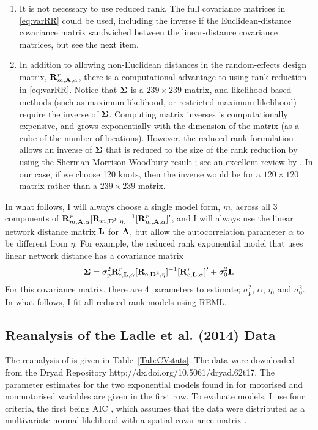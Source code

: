 \documentclass[11pt, titlepage]{article}\usepackage[]{graphicx}\usepackage[]{color}
\begin{document}
\begin{spacing}{1.9}
\begin{flushleft}
\begin{enumerate}
		\item It is not necessary to use reduced rank.  The full covariance matrices in \ref{eq:varRR} could be used, including the inverse if the Euclidean-distance covariance matrix sandwiched between the linear-distance covariance matrices, but see the next item.
		\item In addition to allowing non-Euclidean distances in the random-effects design matrix, $\mathbf{R}^r_{m,\mathbf{A},\alpha}$, there is a computational advantage to using rank reduction in \ref{eq:varRR}.  Notice that $\mbox{\boldmath $\Sigma$}$ is a $239 \times 239$ matrix, and likelihood based methods (such as maximum likelihood, or restricted maximum likelihood) require the inverse of $\mbox{\boldmath $\Sigma$}$.  Computing matrix inverses is computationally expensive, and grows exponentially with the dimension of the matrix (as a cube of the number of locations).  However, the reduced rank formulation allows an inverse of $\mbox{\boldmath $\Sigma$}$ that is reduced to the size of the rank reduction by using the Sherman-Morrison-Woodbury result \citep{Sher:Morr:adju:1949,Wood:inve:1950}; see an excellent review by \citet{Hend:Sear:on:1981}. In our case, if we choose 120 knots, then the inverse would be for a $120 \times 120$ matrix rather than a $239 \times 239$ matrix.
		
\end{enumerate}

In what follows, I will always choose a single model form, $m$, across all 3 components of $\mathbf{R}^r_{m,\mathbf{A},\alpha}[\mathbf{R}_{m,\mathbf{D}^k,\eta}]^{-1}[\mathbf{R}^r_{m,\mathbf{A},\alpha}]^{\prime}$, and I will always use the linear network distance matrix $\mathbf{L}$ for $\mathbf{A}$, but allow the autocorrelation parameter $\alpha$ to be different from $\eta$.  For example, the reduced rank exponential model that uses linear network distance has a covariance matrix
\begin{equation} \label{eq:RRmodCov}
				\mbox{\boldmath $\Sigma$} = \sigma^2_\textrm{p}\mathbf{R}^r_{\textrm{e},\mathbf{L},\alpha}[\mathbf{R}_{\textrm{e},\mathbf{D}^k,\eta}]^{-1}[\mathbf{R}^r_{\textrm{e},\mathbf{L},\alpha}]^{\prime} + \sigma^2_0\mathbf{I}.
\end{equation}
For this covariance matrix, there are 4 parameters to estimate; $\sigma^2_\textrm{p}$, $\alpha$, $\eta$, and $\sigma^2_0$.  In what follows, I fit all reduced rank models using REML.

\subsection*{Reanalysis of the Ladle et al. (2014) Data}

The reanalysis of \citet{Ladl:Avga:Whea:Boyc:pred:2016} is given in Table~\ref{Tab:CVstats}. The data were downloaded from the Dryad Repository http://dx.doi.org/10.5061/dryad.62t17.  The parameter estimates for the two exponential models found in \citet{Ladl:Avga:Whea:Boyc:pred:2016} for motorised and nonmotorised variables are given in the first row.  To evaluate models, I use four criteria, the first being AIC \citep{Akai:Info:1973,Burn:Ande:mode:2002}, which assumes that the data were distributed as a multivariate normal likelihood with a spatial covariance matrix \citep[for an example using spatial models, see][]{Hoet:Davi:Mert:Thom:mode:2006}.   


\end{flushleft}
\end{spacing}
\end{document}
